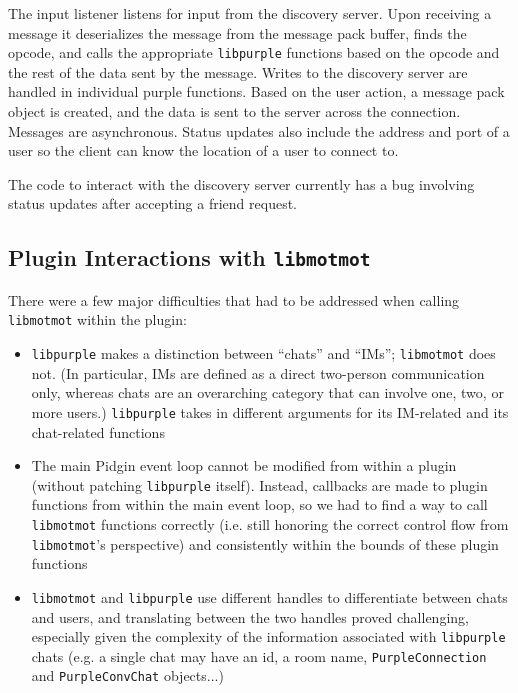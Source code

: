 \documentclass{sig-alternate}
\newcommand\libmotmot{\texttt{libmotmot}\xspace}
\newcommand\libpurple{\texttt{libpurple}\xspace}
\begin{document}
The input listener listens for input from the discovery server. Upon receiving a
message it deserializes the message from the message pack buffer, finds the
opcode, and calls the appropriate \libpurple functions based on the opcode and
the rest of the data sent by the message. Writes to the discovery server are
handled in individual purple functions. Based on the user action, a message pack
object is created, and the data is sent to the server across the connection.
Messages are asynchronous. Status updates also include the address and port
of a user so the client can know the location of a user to connect to.

The code to interact with the discovery server currently has a bug involving
status updates after accepting a friend request.

\subsection{Plugin Interactions with \libmotmot}
There were a few major difficulties that had to be addressed when calling
\libmotmot within the plugin:

\begin{itemize}
\item \libpurple makes a distinction between ``chats'' and ``IMs''; \libmotmot
does not.  (In particular, IMs are defined as a direct two-person communication
only, whereas chats are an overarching category that can involve one, two, or
more users.) \libpurple takes in different arguments for its IM-related and its
chat-related functions

\item The main Pidgin event loop cannot be modified from within a plugin
(without patching \libpurple itself).  Instead, callbacks are made to plugin
functions from within the main event loop, so we had to find a way to call
\libmotmot functions correctly (i.e. still honoring the correct control flow
from \libmotmot's perspective) and consistently within the bounds of these
plugin functions

\item \libmotmot and \libpurple use different handles to differentiate between
chats and users, and translating between the two handles proved challenging,
especially given the complexity of the information associated with \libpurple
chats (e.g. a single chat may have an id, a room name, \verb`PurpleConnection`
and \verb`PurpleConvChat` objects...)

\end{itemize}
\end{document}
